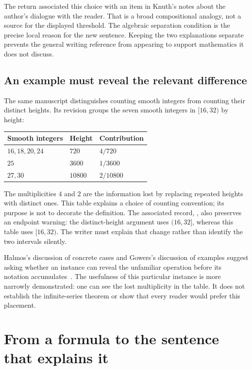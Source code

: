The return associated this choice with an item in Knuth's notes about the
author's dialogue with the reader. That is a broad compositional analogy,
not a source for the displayed threshold. The algebraic separation condition
is the precise local reason for the new sentence. Keeping the two explanations
separate prevents the general writing reference from appearing to support
mathematics it does not discuss.

\subsection{An example must reveal the relevant difference}

The same manuscript distinguishes counting smooth integers from counting
their distinct heights. Its revision groups the seven smooth integers in
$[16,32)$ by height:
\begin{center}
\begin{tabular}{@{}lll@{}}
\toprule
Smooth integers & Height & Contribution\\
\midrule
$16,18,20,24$ & $720$ & $4/720$\\
$25$ & $3600$ & $1/3600$\\
$27,30$ & $10800$ & $2/10800$\\
\bottomrule
\end{tabular}
\end{center}
The multiplicities $4$ and $2$ are the information lost by replacing repeated
heights with distinct ones. This table explains a choice of counting
convention; its purpose is not to decorate the definition. The associated
record, , also preserves an endpoint warning:
the distinct-height argument uses $(16,32]$, whereas this table uses
$[16,32)$. The writer must explain that change rather than identify the two
intervals silently.

Halmos's discussion of concrete cases and Gowers's discussion of examples
suggest asking whether an instance can reveal the unfamiliar operation before
its notation accumulates~\cite[\S4]{halmos}\cite{gowers}. The usefulness of this
particular instance is more narrowly demonstrated: one can see the lost
multiplicity in the table. It does not establish the infinite-series theorem
or show that every reader would prefer this placement.


\section{From a formula to the sentence that explains it}\label{sec:worked-explanations}

